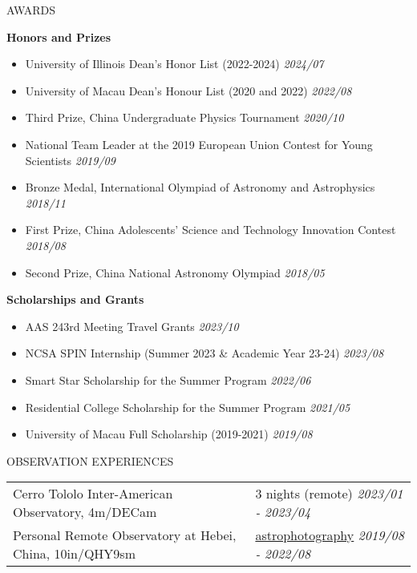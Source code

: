 \documentclass[11pt]{article} %
\begin{document}
\begin{section}{AWARDS}

\textbf{Honors and Prizes}

\begin{itemize}[leftmargin=1.5em]
    \item University of Illinois Dean's Honor List (2022-2024) \hfill \textit{2024/07}
    \item University of Macau Dean's Honour List (2020 and 2022) \hfill \textit{2022/08}
    \item Third Prize, China Undergraduate Physics Tournament \hfill \textit{2020/10}
    \item National Team Leader at the 2019 European Union Contest for Young Scientists \hfill \textit{2019/09}
    \item Bronze Medal, International Olympiad of Astronomy and Astrophysics \hfill \textit{2018/11}
    \item First Prize, China Adolescents' Science and Technology Innovation Contest \hfill \textit{2018/08}
    \item Second Prize, China National Astronomy Olympiad \hfill \textit{2018/05}
\end{itemize}
        
\textbf{Scholarships and Grants}

\begin{itemize}[leftmargin=1.5em]
    \item AAS 243rd Meeting Travel Grants \hfill \textit{2023/10}
    \item NCSA SPIN Internship (Summer 2023 \& Academic Year 23-24) \hfill \textit{2023/08}
    \item Smart Star Scholarship for the Summer Program \hfill \textit{2022/06}
    \item Residential College Scholarship for the Summer Program \hfill \textit{2021/05}
    \item University of Macau Full Scholarship (2019-2021) \hfill \textit{2019/08}
\end{itemize}
        
\end{section}

\begin{section}{OBSERVATION EXPERIENCES}

\begin{tabular}{@{}p{0.6\linewidth}@{}p{0.4\linewidth}@{}}
    Cerro Tololo Inter-American Observatory, 4m/DECam & 3 nights (remote) \hfill \textit{2023/01 - 2023/04} \\
    Personal Remote Observatory at Hebei, China, 10in/QHY9sm & \href{https://yliu.fit/astrophotography/}{astrophotography} \hfill \textit{2019/08 - 2022/08}
\end{tabular}

\end{section}
\end{document}
